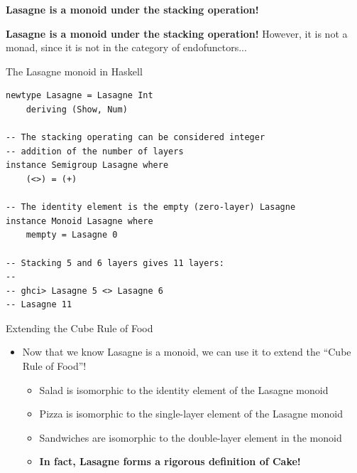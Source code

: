 \documentclass{beamer}
\begin{document}
\begin{frame}
    \begin{center}
        \Huge\textbf{Lasagne is a monoid under the stacking operation!}
    \end{center}
\end{frame}

\begin{frame}
    \begin{center}
        \Huge\textbf{Lasagne is a monoid under the stacking operation!}
        \vskip 2cm
        \small{However, it is not a monad, since it is not in the category of endofunctors...}
    \end{center}
\end{frame}

\begin{frame}[fragile]{The Lasagne monoid in Haskell}
    \begin{verbatim}
newtype Lasagne = Lasagne Int
    deriving (Show, Num)

-- The stacking operating can be considered integer 
-- addition of the number of layers
instance Semigroup Lasagne where
    (<>) = (+)

-- The identity element is the empty (zero-layer) Lasagne
instance Monoid Lasagne where
    mempty = Lasagne 0

-- Stacking 5 and 6 layers gives 11 layers:
--
-- ghci> Lasagne 5 <> Lasagne 6
-- Lasagne 11
    \end{verbatim}
\end{frame}


\begin{frame}{Extending the Cube Rule of Food}
    \begin{itemize}
        \item<1-> Now that we know Lasagne is a monoid, we can use it to extend the ``Cube Rule of Food''!
        \begin{itemize}
            \item<2-> Salad is isomorphic to the identity element of the Lasagne monoid
            \item<3-> Pizza is isomorphic to the single-layer element of the Lasagne monoid
            \item<4-> Sandwiches are isomorphic to the double-layer element in the monoid
            \vskip 0.5cm
            \item<5-> \textbf{In fact, Lasagne forms a rigorous definition of Cake!}
        \end{itemize}
    \end{itemize}
\end{frame}
\end{document}
